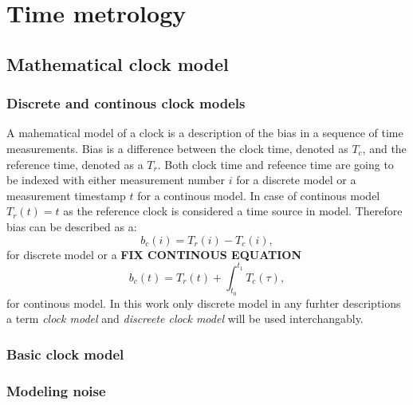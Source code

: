 \chapter{Time metrology}


\section{Mathematical clock model}

\subsection{Discrete and continous clock models}
A mahematical model of a clock is a description of the bias in a sequence of time measurements.
Bias is a difference between the clock time, denoted as $T_{c}$, and the reference time,
denoted as a $T_{r}$. Both clock time and refeence time are going to be indexed with either
measurement number $i$ for a discrete model or a measurement timestamp  $t$ for a continous 
model. In case of continous model $T_{r}(t)=t$ as the reference clock is considered a
time source in model. Therefore bias can be described as a:
\begin{equation}
	b_{c}(i) = T_{r}(i) - T_{c}(i),
\end{equation}
for discrete model or a \textbf{FIX CONTINOUS EQUATION}
\begin{equation}
	b_{c}(t) = T_{r}(t) + \int_{t_0}^{t_1}T_{c}(\tau),
\end{equation}
for continous model.
In this work only discrete model in any furhter descriptions a term \emph{clock model} and
\emph{discreete clock model} will be used interchangably.



\subsection{Basic clock model}

\subsection{Modeling noise}

